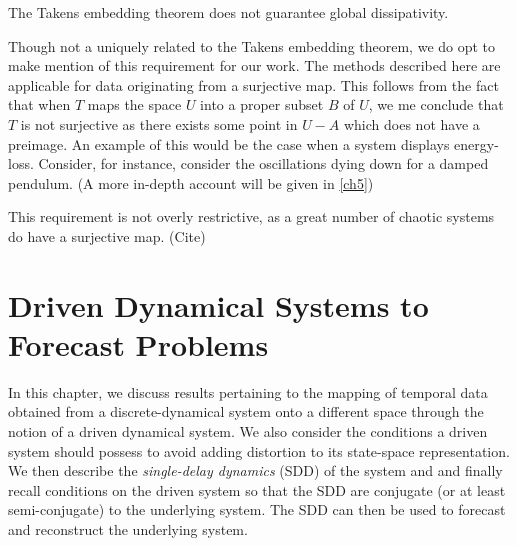 \documentclass[a4paper,12pt,twoside]{report}
\begin{document}
The Takens embedding theorem does not guarantee global dissipativity.


Though not a uniquely related to the Takens embedding theorem, we do opt to make mention of this requirement for our work. 
The methods described here are applicable for data originating from a surjective map. 
This follows from the fact that when $T$ maps the space $U$ into a proper subset $B$ of $U$, we me conclude that $T$ is not surjective as there exists some point in $U-A$ which does not have a preimage.
An example of this would be the case when a system displays energy-loss. Consider, for instance, consider the oscillations dying down for a damped pendulum. (A more in-depth account will be given in \ref{ch5})

This requirement is not overly restrictive, as a great number of chaotic systems do have a surjective map. (Cite) 


\chapter{Driven Dynamical Systems to Forecast Problems}\label{ch4}

In this chapter, we discuss results pertaining to the mapping of temporal data obtained from a discrete-dynamical system onto a different space through the notion of a driven dynamical system. 
We also consider the conditions a driven system should possess to avoid adding distortion to its state-space representation. We then describe the \emph{single-delay dynamics} (SDD) of the system and and finally recall conditions on the driven system so that the SDD are conjugate (or at least semi-conjugate) to the underlying system. 
The SDD can then be used to forecast and reconstruct the underlying system. 
\end{document}
